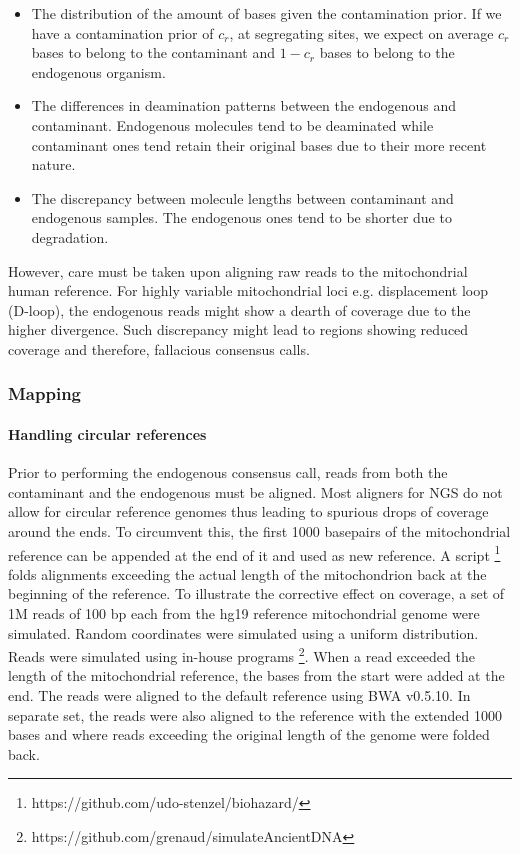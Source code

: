 \documentclass[a4paper,12pt]{article}
\begin{document}
\begin{itemize}
\begin{itemize}


\begin{itemize}
\item The distribution of the amount of bases given the contamination prior. If we have a contamination prior of $c_r$, at segregating sites, we expect on average $c_r$ bases to belong to the contaminant and $1-c_r$ bases to belong to the endogenous organism.
\item The differences in deamination patterns between the endogenous and contaminant. Endogenous molecules tend to be deaminated while contaminant ones tend retain their original bases due to their more recent nature. 
\item The discrepancy between molecule lengths between contaminant and endogenous samples. The endogenous ones tend to be shorter due to degradation.
\end{itemize}

However, care must be taken upon aligning raw reads to the mitochondrial human reference. For highly variable mitochondrial loci e.g. displacement loop (D-loop), the endogenous reads might show a dearth of coverage due to the higher divergence. Such discrepancy might lead to regions showing reduced coverage and therefore, fallacious consensus calls.












\subsubsection{Mapping}
\label{sec:methodsmapping}
\noindent \paragraph{Handling circular references}

Prior to performing the endogenous consensus call, reads from both the contaminant and the endogenous must be aligned. Most aligners for NGS do not allow for circular reference genomes thus leading to spurious drops of coverage around the ends. To circumvent this, the first 1000 basepairs  of the mitochondrial reference can be appended at the end of it and used as new reference. A script \footnote{https://github.com/udo-stenzel/biohazard/} folds alignments exceeding the actual length of the mitochondrion back at the beginning of the reference. To illustrate the corrective effect on coverage, a set of 1M reads of 100 bp each from the hg19 reference mitochondrial genome were simulated. Random coordinates were simulated using a uniform distribution. Reads were simulated using in-house programs \footnote{https://github.com/grenaud/simulateAncientDNA}. When a read exceeded the length of the mitochondrial reference, the bases from the start were added at the end. The reads were aligned to the default reference using BWA v0.5.10\cite{li2009fast}.  In separate set, the reads were also aligned to the reference with the extended 1000 bases and where reads exceeding the original length of the genome were folded back. 



\end{itemize}
\end{itemize}
\end{document}
